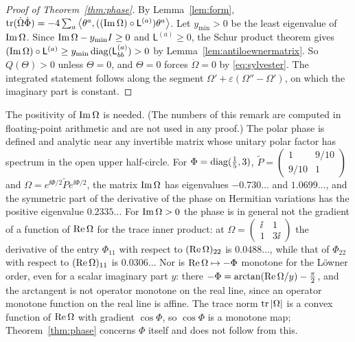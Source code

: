\begin{proof}[Proof of Theorem~\ref{thm:phase}]
By Lemma~\ref{lem:form},
$\operatorname{tr}(\dot\Omega\dot\Phi)=-4\sum_a\left\langle\theta^a,((\operatorname{Im}\Omega)\circ\mathsf L^{(a)})\theta^a\right\rangle$.
Let $y_{\min}>0$ be the least eigenvalue of $\operatorname{Im}\Omega$. Since
$\operatorname{Im}\Omega-y_{\min}I\geq0$ and $\mathsf L^{(a)}\geq0$, the Schur product
theorem \cite[Section~7.5]{hj13} gives
$(\operatorname{Im}\Omega)\circ\mathsf L^{(a)}\geq y_{\min}\operatorname{diag}(\mathsf L^{(a)}_{bb})>0$ by
Lemma~\ref{lem:antiloewnermatrix}. So $Q(\Theta)>0$ unless $\Theta=0$, and
$\Theta=0$ forces $\dot\Omega=0$ by \eqref{eq:sylvester}. The integrated
statement follows along the segment
$\Omega'+\varepsilon(\Omega''-\Omega')$, on which the imaginary part is
constant.
\end{proof}

\begin{remark}\label{rem:phasefails}
The positivity of $\operatorname{Im}\Omega$ is needed. (The numbers of this remark are
computed in floating-point arithmetic and are not used in any proof.) The
polar phase is defined and
analytic near any invertible matrix whose unitary polar factor has spectrum
in the open upper half-circle. For $\Phi=\operatorname{diag}(\frac15,3)$,
$\tilde P=\left(\begin{smallmatrix}1&9/10\\9/10&1\end{smallmatrix}\right)$ and
$\Omega=e^{\ii\Phi/2}\tilde Pe^{\ii\Phi/2}$, the matrix $\operatorname{Im}\Omega$ has
eigenvalues $-0.730\ldots$ and $1.0699\ldots$, and the symmetric part of the
derivative of the phase on Hermitian variations has the positive eigenvalue
$0.2335\ldots$ For $\operatorname{Im}\Omega>0$ the phase is in general not the gradient of
a function of $\operatorname{Re}\Omega$ for the trace inner product: at
$\Omega=\left(\begin{smallmatrix}\ii&1\\1&3\ii\end{smallmatrix}\right)$ the
derivative of the entry $\Phi_{11}$ with respect to $(\operatorname{Re}\Omega)_{22}$ is
$0.0488\ldots$, while that of $\Phi_{22}$ with respect to $(\operatorname{Re}\Omega)_{11}$
is $0.0306\ldots$ Nor is $\operatorname{Re}\Omega\mapsto-\Phi$ monotone for the L\"owner
order, even for a scalar imaginary part $y$: there
$-\Phi=\arctan(\operatorname{Re}\Omega/y)-\frac\pi2$, and the arctangent is not operator
monotone on the real line, since an operator monotone function on the real
line is affine. The
trace norm $\operatorname{tr}|\Omega|$ is a convex function of $\operatorname{Re}\Omega$ with gradient
$\cos\Phi$, so $\cos\Phi$ is a monotone map; Theorem~\ref{thm:phase} concerns
$\Phi$ itself and does not follow from this.
\end{remark}
